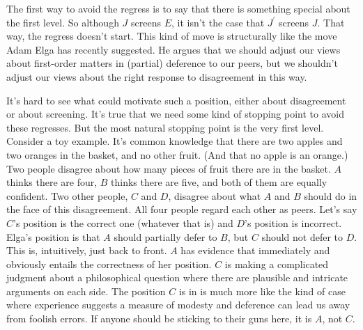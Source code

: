 The first way to avoid the regress is to say that there is something special about the first level. So although \(J\) screens \(E\), it isn't the case that \(J^\prime\) screens \(J\). That way, the regress doesn't start. This kind of move is structurally like the move Adam Elga \citeyearpar{Elga2010-ELGHTD} has recently suggested. He argues that we should adjust our views about first-order matters in (partial) deference to our peers, but we shouldn't adjust our views about the right response to disagreement in this way.

It's hard to see what could motivate such a position, either about disagreement or about screening. It's true that we need some kind of stopping point to avoid these regresses. But the most natural stopping point is the very first level. Consider a toy example. It's common knowledge that there are two apples and two oranges in the basket, and no other fruit. (And that no apple is an orange.) Two people disagree about how many pieces of fruit there are in the basket. \(A\) thinks there are four, \(B\) thinks there are five, and both of them are equally confident. Two other people, \(C\) and \(D\), disagree about what \(A\) and \(B\) should do in the face of this disagreement. All four people regard each other as peers. Let's say \(C\)'s position is the correct one (whatever that is) and \(D\)'s position is incorrect. Elga's position is that \(A\) should partially defer to \(B\), but \(C\) should not defer to \(D\). This is, intuitively, just back to front. \(A\) has evidence that immediately and obviously entails the correctness of her position. \(C\) is making a complicated judgment about a philosophical question where there are plausible and intricate arguments on each side. The position \(C\) is in is much more like the kind of case where experience suggests a measure of modesty and deference can lead us away from foolish errors. If anyone should be sticking to their guns here, it is \(A\), not \(C\).

